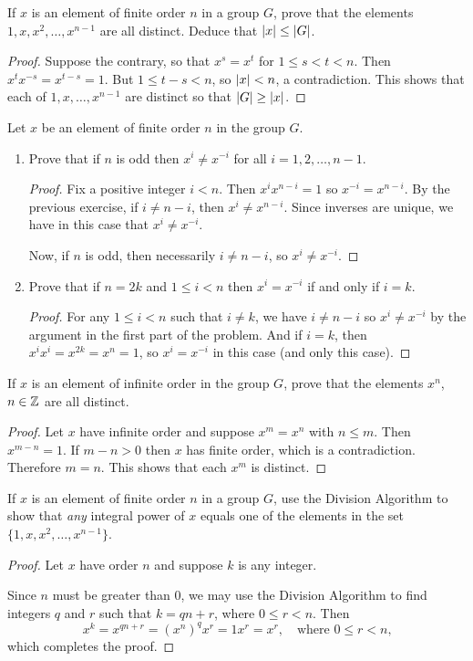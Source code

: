 If $x$ is an element of finite order $n$ in a group $G$,
prove that the elements $1, x, x^2, \dots, x^{n-1}$ are all
distinct. Deduce that $\lvert{x}\rvert\leq\lvert{G}\rvert$.
\begin{proof}
  Suppose the contrary, so that $x^s = x^t$ for $1\leq s < t<n$. Then
  $x^tx^{-s} = x^{t-s} = 1$. But $1\leq t-s < n$, so $\lvert{x}\rvert < n$, a
  contradiction. This shows that each of $1, x,\dots,x^{n-1}$ are
  distinct so that $\lvert{G}\rvert\geq\lvert{x}\rvert$.
\end{proof}

 Let $x$ be an element of finite order $n$ in the group
$G$.
\label{exercise-power-own-inverse}
\begin{enumerate}
\item Prove that if $n$ is odd then $x^i\neq x^{-i}$ for all
  $i = 1, 2, \dots, n-1$.
  \begin{proof}
    Fix a positive integer $i < n$. Then $x^ix^{n-i} = 1$ so
    $x^{-i} = x^{n-i}$. By the previous exercise, if $i\neq n-i$, then
    $x^i\neq x^{n-i}$. Since inverses are unique, we have in this case
    that $x^i\neq x^{-i}$.

    Now, if $n$ is odd, then necessarily $i\neq n-i$, so
    $x^i\neq x^{-i}$.
  \end{proof}
\item Prove that if $n = 2k$ and $1\leq i < n$ then $x^i = x^{-i}$ if
  and only if $i = k$.
  \begin{proof}
    For any $1\leq i<n$ such that $i\neq k$, we have $i\neq n-i$ so
    $x^i\neq x^{-i}$ by the argument in the first part of the
    problem. And if $i = k$, then $x^ix^i = x^{2k} = x^n = 1$, so
    $x^i = x^{-i}$ in this case (and only this case).
  \end{proof}
\end{enumerate}

 If $x$ is an element of infinite order in the group $G$,
prove that the elements $x^n$, $n\in\mathbb{Z}$ are all distinct.
\begin{proof}
  Let $x$ have infinite order and suppose $x^m = x^n$ with $n\leq
  m$. Then $x^{m-n} = 1$. If $m-n > 0$ then $x$ has finite order,
  which is a contradiction. Therefore $m = n$. This shows that each
  $x^m$ is distinct.
\end{proof}

 If $x$ is an element of finite order $n$ in a group $G$,
use the Division Algorithm to show that {\em any} integral power of
$x$ equals one of the elements in the set $\{1,x,x^2,\dots,x^{n-1}\}$.
\begin{proof}
  Let $x$ have order $n$ and suppose $k$ is any integer.

  Since $n$ must be greater than $0$, we may use the Division
  Algorithm to find integers $q$ and $r$ such that $k = qn + r$, where
  $0\leq r<n$. Then
  \begin{equation*}
    x^k = x^{qn+r} = (x^n)^qx^r = 1x^r = x^r,
    \quad \text{where $0\leq r<n$,}
  \end{equation*}
  which completes the proof.
\end{proof}

